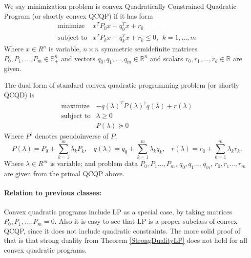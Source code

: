 \documentclass[10pt,oneside]{book}
\theoremstyle{definition}
\begin{document}
\label{defCQP}
We say minimization problem is convex Quadratically Constrained Quadratic Program (or shortly convex QCQP) if it has form
\begin{equation}
\label{QCQP} 
\begin{array}{ll}
\mbox{minimize} &x^TP_0x + q_0^Tx + r_0 \\
\mbox{subject to}& x^TP_kx + q_k^Tx + r_k \leq 0 , \ \ k = 1,\dots ,m  
\end{array} 
\tag{QCQP}
\end{equation}
Where $x\in R^n$ is variable, $n\times n$ symmetric semidefinite matrices $P_0,P_1,\dots ,P_m\in \mathbb{S}_+^n$ and vectors $q_0,q_1,\dots,q_m \in \mathbb{R}^n$ and scalars $r_0,r_1,\dots ,r_k\in \mathbb{R}$ are given.

\bigskip

The dual form of standard convex quadratic programming problem (or shortly QCQD) is 
\begin{equation}
\label{QCQD} 
\begin{array}{ll}
\mbox{maximize} & -q(\lambda)^TP(\lambda)^{\dagger}q(\lambda) + r(\lambda) \\
\mbox{subject to}&  \lambda \geq 0\\
& P(\lambda )\succeq 0
\end{array} 
\tag{QCQD}
\end{equation}
Where $P^\dagger$ denotes pseudoinverse of $P$, $$ P(\lambda) = P_0 + \sum_{k = 1}^m \lambda_kP_k, \ \ \ \  q(\lambda) = q_0 + \sum_{k = 1}^m \lambda_kq_k, \ \ \ \ r(\lambda) = r_0 + \sum_{k =1}^m \lambda_kr_k. $$
Where $\lambda\in R^m$ is variable; and problem data $P_0,P_1\dots ,P_m$, $q_0,q_1\dots ,q_m$, $r_0,r_1\dots , r_m$ are given from the primal QCQP above.
\bigskip

\paragraph{Relation to previous classes:}

Convex quadratic programs include LP as a special case, by taking matrices $P_0,P_1,\dots ,P_m = 0$.
Also it is easy to see that LP is a proper subclass of convex QCQP, since it does not include quadratic constraints. 
The more solid proof of that is that strong duality from Theorem \ref{StrongDualityLP} does not hold for all convex quadratic programs. 
\end{document}
